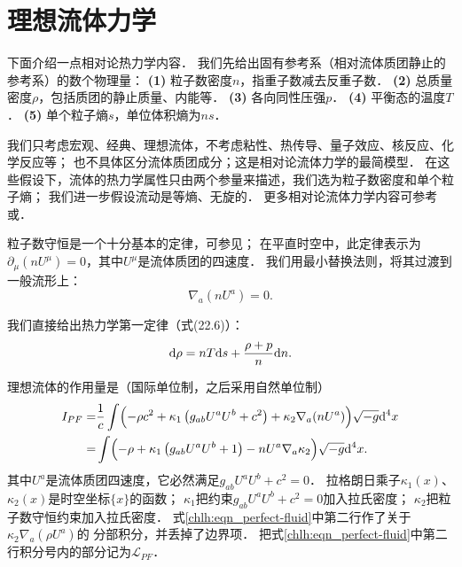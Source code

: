 \section{理想流体力学}\label{chlh:perfect-fluid}


下面介绍一点相对论热力学内容\cite[\S 22.2]{mtw1973}．
我们先给出固有参考系（相对流体质团静止的参考系）的数个物理量：
{\bfseries (1)} 粒子数密度$n$，指重子数减去反重子数．
{\bfseries (2)} 总质量密度$\rho$，包括质团的静止质量、内能等．
{\bfseries (3)} 各向同性压强$p$．
{\bfseries (4)} 平衡态的温度$T$．
{\bfseries (5)} 单个粒子熵$s$，单位体积熵为$n s$．


我们只考虑宏观、经典、理想流体，不考虑粘性、热传导、量子效应、核反应、化学反应等；
也不具体区分流体质团成分；这是相对论流体力学的最简模型．
在这些假设下，流体的热力学属性只由两个参量来描述，我们选为粒子数密度和单个粒子熵；
我们进一步假设流动是等熵、无旋的．
更多相对论流体力学内容可参考\parencite[Ch.15]{landau_6-fluid}或\parencite[\S 2.10]{weinberg_grav-1972}．


{\kaishu 粒子数守恒}是一个十分基本的定律，可参见\parencite[\S 3]{landau_5-statistical}；
在平直时空中，此定律表示为$\partial_\mu (n U^\mu)=0$，其中$U^\mu$是流体质团的四速度．
我们用最小替换法则，将其过渡到一般流形上：
\begin{equation}\label{chlh:eqn_particle-cons}
    \nabla_a (n U^a) = 0.
\end{equation}


我们直接给出热力学第一定律（\parencite[\S 22.2]{mtw1973}式(22.6)）：
\begin{equation}\label{chlh:eqn_1TDL}
    {\rm d}\rho = n T {\rm d}s +\frac{\rho+p}{n} {\rm d}n .
\end{equation}



理想流体的作用量\cite{Ray-1972}是（国际单位制，之后采用自然单位制）
\begin{equation}\label{chlh:eqn_perfect-fluid}
    \begin{aligned}
    I_{PF}=&\frac{1}{c}\int \Bigl(-\rho c^2
    +\kappa_1\left(g_{ab}U^a U^b+c^2 \right) 
    +\kappa_2 \nabla_a (n U^a)  \Bigr)
    \sqrt{-g}  {\rm d}^4x  \\
    =&\int \Bigl(-\rho
    +\kappa_1\left(g_{ab}U^a U^b+1 \right) 
    -n U^a \nabla_a\kappa_2   \Bigr)
    \sqrt{-g}  {\rm d}^4x .
\end{aligned}
\end{equation}
其中$U^a$是流体质团四速度，它必然满足$g_{ab}U^a U^b+c^2=0$．
拉格朗日乘子$\kappa_1(x)$、$\kappa_2(x)$是时空坐标$\{x\}$的函数；
$\kappa_1$把约束$g_{ab}U^a U^b+c^2=0$加入拉氏密度；
$\kappa_2$把粒子数守恒约束加入拉氏密度．
式\eqref{chlh:eqn_perfect-fluid}中第二行作了关于$\kappa_2 \nabla_a (\rho U^a) $的
分部积分，并丢掉了边界项．
把式\eqref{chlh:eqn_perfect-fluid}中第二行积分号内的部分记为$\mathscr{L}_{PF}$．

